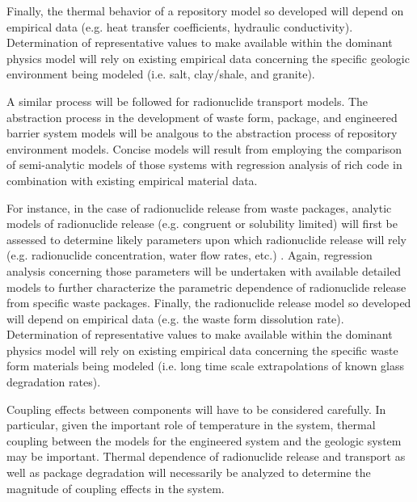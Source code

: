 
Finally, the thermal behavior of a repository model so developed will depend on 
empirical data (e.g.  heat transfer coefficients, hydraulic conductivity).  
Determination of representative values to make available within the dominant 
physics model will rely on existing empirical data concerning the specific 
geologic environment being modeled (i.e. salt, clay/shale, and granite). 


A similar process will be followed for radionuclide transport models.  The 
abstraction process in the development of waste form, package, and engineered 
barrier system models will be analgous to the abstraction process of repository 
environment models. Concise models will result from employing the comparison of 
semi-analytic models of those systems with regression analysis of rich code in 
combination with existing empirical material data.


For instance, in the case of radionuclide release from waste packages, analytic 
models of radionuclide release (e.g.  congruent or solubility limited) will 
first be assessed to determine likely parameters upon which radionuclide release 
will rely (e.g.  radionuclide concentration, water flow rates, etc.) 
\cite{kawasaki_congruent_2004}.  Again, regression analysis concerning those 
parameters will be undertaken with available detailed models to further 
characterize the parametric dependence of radionuclide release from specific 
waste packages.  Finally, the radionuclide release model so developed will 
depend on empirical data (e.g. the waste form dissolution rate).  Determination 
of representative values to make available within the dominant physics model 
will rely on existing empirical data concerning the specific waste form  
materials being modeled (i.e. long time scale extrapolations of known glass 
degradation rates).  


Coupling effects between components will have to be considered carefully.  In 
particular, given the important role of temperature in the system, thermal 
coupling between the models for the engineered system and the geologic system 
may be important. Thermal dependence of radionuclide release and transport as 
well as package degradation will necessarily be analyzed to determine the 
magnitude of coupling effects in the system.

